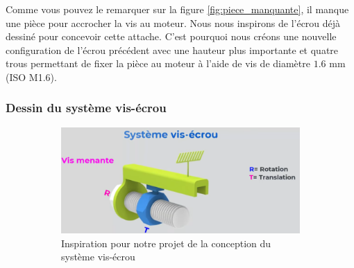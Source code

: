 \documentclass[a4paper, 11pt]{report}
\begin{document}
            Comme vous pouvez le remarquer sur la figure \ref{fig:piece_manquante}, il manque une pièce pour accrocher la vis au moteur. Nous nous inspirons de l'écrou déjà dessiné pour concevoir cette attache. C'est pourquoi nous créons une nouvelle configuration de l'écrou précédent avec une hauteur plus importante et quatre trous permettant de fixer la pièce au moteur à l'aide de vis de diamètre $1.6$ mm (ISO M1.6).

        \subsubsection{Dessin du système vis-écrou}

            \begin{figure}
                \centering
                \begin{subfigure}[t]{0.5\textwidth}
                    \centering
                    \includegraphics[width=\textwidth]{Figures/système vis écrou.png}
                    \caption{Inspiration pour notre projet de la conception du système vis-écrou \cite{w3d_tech_systeme_2023}}
                    \label{fig:vis_ecrou}
                \end{subfigure}
                \hfill
                \begin{subfigure}[t]{0.2\textwidth}
                    \centering

\end{subfigure}
\end{figure}
\end{document}
